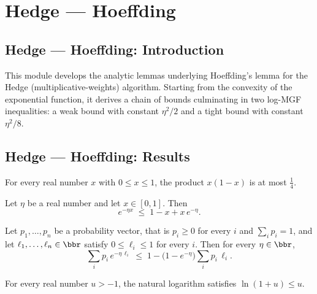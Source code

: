 \section{Hedge --- Hoeffding}
\subsection*{Hedge --- Hoeffding: Introduction}

This module develops the analytic lemmas underlying Hoeffding's lemma for the Hedge
(multiplicative-weights) algorithm.  Starting from the convexity of the exponential
function, it derives a chain of bounds culminating in two log-MGF inequalities:
a weak bound with constant $\eta^2/2$ and a tight bound with constant $\eta^2/8$.

\subsection*{Hedge --- Hoeffding: Results}

\begin{lemma}
\label{mul_one_sub_le_quarter}
\leanok
{}
For every real number $x$ with $0 \le x \le 1$, the product $x(1-x)$ is at most
$\tfrac{1}{4}$.
\end{lemma}

\begin{theorem}
\label{exp_convexity_bound'}
\leanok
{}
Let $\eta$ be a real number and let $x \in [0,1]$. Then
\[
  e^{-\eta x} \;\le\; 1 - x + x\,e^{-\eta}.
\]
\end{theorem}

\begin{theorem}
\label{weighted_exp_le_affine}
\leanok
{}
Let $p_1,\dots,p_n$ be a probability vector, that is $p_i \ge 0$ for every $i$ and
$\sum_{i} p_i = 1$, and let $\ell_1,\dots,\ell_n \in \bbr$ satisfy $0 \le \ell_i \le 1$
for every $i$. Then for every $\eta \in \bbr$,
\[
  \sum_{i} p_i\, e^{-\eta\,\ell_i}
  \;\le\;
  1 - \bigl(1 - e^{-\eta}\bigr)\sum_{i} p_i\,\ell_i.
\]
\end{theorem}

\begin{theorem}
\label{log_one_add_le}
\leanok
{}
For every real number $u > -1$, the natural logarithm satisfies $\ln(1+u) \le u$.
\end{theorem}


